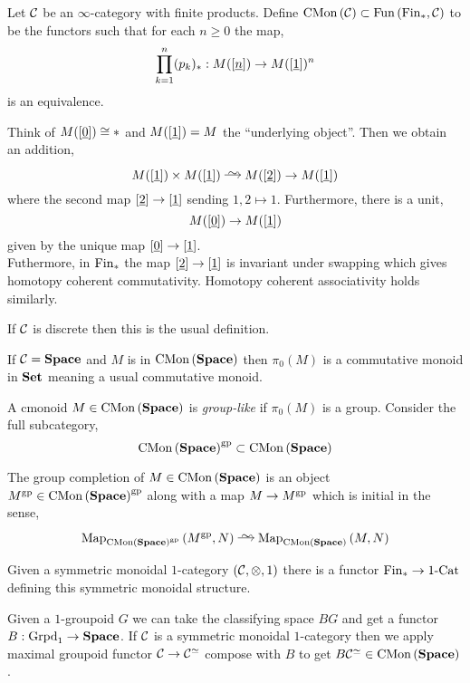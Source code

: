 \documentclass[12pt]{article}
\begin{document}
\begin{defn}
Let $\mathcal{C}$ be an $\infty$-category with finite products. Define $\mathrm{CMon}\left( \mathcal{C} \right) \subset \mathrm{Fun}\left( \mathrm{Fin}_*, \mathcal{C} \right)$ to be the functors such that for each $n \ge 0$ the map,
\[  \prod_{k = 1}^n (p_k)_* : M([\underline{n}]) \to M([\underline{1}])^n \] 
is an equivalence.
\end{defn}

\begin{rmk}
Think of $M([\underline{0}]) \cong *$ and $M([\underline{1}]) = M$ the ``underlying object''. Then we obtain an addition,
\[ M([\ul{1}]) \times M([\ul{1}]) \iso M([\ul{2}]) \to M([\ul{1}]) \]
where the second map $[\underline{2}] \to [\underline{1}]$ sending $1,2 \mapsto 1$. Furthermore, there is a unit,
\[ M([\underline{0}]) \to M([\underline{1}]) \]
given by the unique map $[\underline{0}] \to [\underline{1}]$. 
\bigskip\\
Futhermore, in $\mathrm{Fin}_*$ the map $[\underline{2}] \to [\underline{1}]$ is invariant under swapping which gives homotopy coherent commutativity. Homotopy coherent associativity holds similarly. 
\end{rmk}

\begin{exercise}
If $\mathcal{C}$ is discrete then this is the usual definition. 
\end{exercise}

\begin{rmk}
If $\mathcal{C} = \mathbf{Space}$ and $M$ is in $\mathrm{CMon}\left( \mathbf{Space} \right)$ then $\pi_0(M)$ is a commutative monoid in $\mathbf{Set}$ meaning a usual commutative monoid. 
\end{rmk}

\begin{defn}
A cmonoid $M \in \mathrm{CMon}\left( \mathbf{Space} \right)$ is \textit{group-like} if $\pi_0(M)$ is a group. Consider the full subcategory,
\[ \mathrm{CMon}\left( \mathbf{Space} \right)^{\mathrm{gp}} \subset \mathrm{CMon}\left( \mathbf{Space} \right) \]
\end{defn}

\begin{defn}
The group completion of $M \in \mathrm{CMon}\left( \mathbf{Space} \right)$ is an object $M^{\mathrm{gp}} \in \mathrm{CMon}\left( \mathbf{Space} \right)^{\mathrm{gp}}$ along with a map $M \to M^{\mathrm{gp}}$ which is initial in the sense,
\[ \Map{\CMon{\Space}^\gp}{M^\gp}{N}  \iso \Map{\CMon{\Space}}{M}{N} \]
\end{defn}

\begin{rmk}
Given a symmetric monoidal $1$-category $(\mathcal{C}, \otimes, 1)$ there is a functor $\mathrm{Fin}_* \to \text{1-Cat}$ defining this symmetric monoidal structure. 
\end{rmk}

Given a $1$-groupoid $G$ we can take the classifying space $BG$ and get a functor $B : \mathrm{Grpd}_1 \to \mathbf{Space}$. If $\mathcal{C}$ is a symmetric monoidal $1$-category then we apply maximal groupoid functor $\mathcal{C} \to \mathcal{C}^{\simeq}$ compose with $B$ to get $B \mathcal{C}^{\simeq} \in \mathrm{CMon}\left( \mathbf{Space} \right)$.
\end{document}
